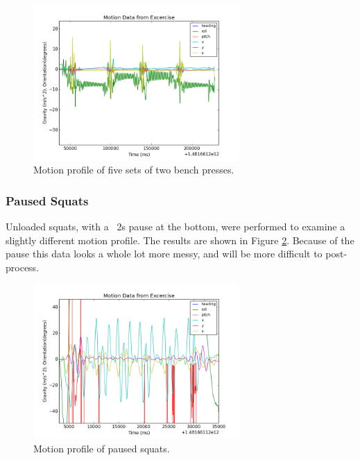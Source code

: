 \documentclass[11pt,oneside]{amsart}
\begin{document}
\begin{figure}[htbp]
\begin{center}
\includegraphics[width=0.7\textwidth]{figures/bench_sets_heavy.png}
\caption{Motion profile of five sets of two bench presses.}
\label{fig:sets_heavy}
\end{center}
\end{figure}

\subsubsection{Paused Squats}
Unloaded squats, with a ~2s pause at the bottom, were performed to examine a slightly different motion profile. The results are shown in Figure \ref{fig:squats}. Because of the pause this data looks a whole lot more messy, and will be more difficult to post-process.
\begin{figure}[htbp]
\begin{center}
\includegraphics[width=0.7\textwidth]{figures/pause_squats.png}
\caption{Motion profile of paused squats.}
\label{fig:squats}
\end{center}
\end{figure}
\end{document}
